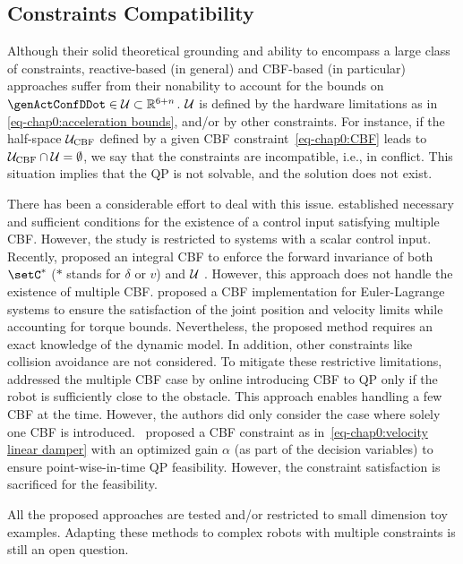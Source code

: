\subsection{Constraints Compatibility}\label{subsec-chap0:constraints compatibility}
Although their solid theoretical grounding and ability to encompass a large class of constraints, reactive-based (in general) and CBF-based (in particular) approaches suffer from their nonability to account for the bounds on  ${\genActConfDDot}\in {\cal U} \subset\mathbb{R}^{6+n}$. ${\cal U}$ is defined by the hardware limitations as in \cref{eq-chap0:acceleration bounds}, and/or by other constraints. For instance, if the half-space ${\cal U}_{\rm CBF}$ defined by a given CBF constraint~\cref{eq-chap0:CBF} leads to  ${\cal U}_{\rm CBF}\cap{\cal U}=\emptyset$, we say that the constraints are incompatible, i.e., in conflict. This situation implies that the QP is not solvable, and the solution does not exist. 

There has been a considerable effort to deal with this issue. \cite{xu2018automatica} established necessary and sufficient conditions for the existence of a control input satisfying multiple CBF. However, the study is restricted to systems with a scalar control input. Recently, \cite{ames2021csl} proposed an integral CBF to enforce the forward invariance of both $\setC^{*}$ ($*$ stands for $\delta$ or $v$) and ${\cal U}$ . However, this approach does not handle the existence of multiple CBF. \cite{cortez2020acc} proposed a CBF implementation for Euler-Lagrange systems to ensure the satisfaction of the joint position and velocity limits while accounting for torque bounds. Nevertheless, the proposed method requires an exact knowledge of the dynamic model. In addition, other constraints like collision avoidance are not considered. To mitigate these restrictive limitations, \cite{cortez2021csl} addressed the multiple CBF case by online introducing CBF to QP only if the robot is sufficiently close to the obstacle. This approach enables handling a few CBF at the time. However, the authors did only consider the case where solely one CBF is introduced.~\cite{zeng2021acc1} proposed a CBF constraint as in~\cref{eq-chap0:velocity linear damper} with an optimized gain $\alpha$ (as part of the decision variables) to ensure point-wise-in-time QP feasibility. However, the constraint satisfaction is sacrificed for the feasibility. 

All the proposed approaches are tested and/or restricted to small dimension toy examples. Adapting these methods to complex robots with multiple constraints is still an open question.

